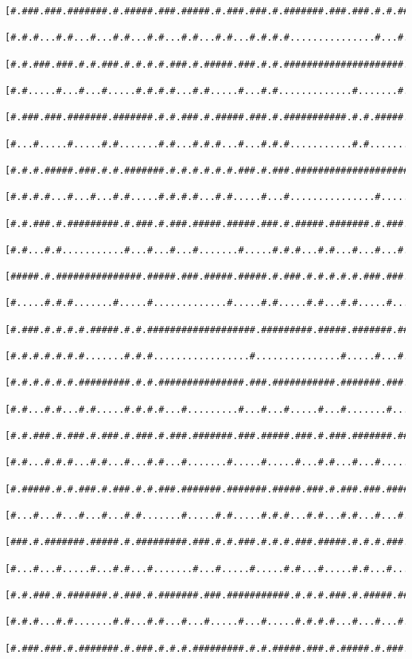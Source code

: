 \documentclass[a4paper,10pt,ngerman]{scrartcl}
\begin{document}
\begin{lstlisting}[frame=tb,basicstyle=\tiny\ttfamily]
 [#.###.###.#######.#.#####.###.#####.#.###.###.#.#######.###.###.#.#.#######.#.#.#.#######.#.#.#####.#]
 [#.#.#...#.#...#...#.#...#.#...#.#...#.#...#.#.#.#...............#...#.......#.#.#.#.......#.#.#.#...#]
 [#.#.###.###.#.#.###.#.#.#.#.###.#.#####.###.#.#.#####################.#######.#.#.#.#######.#.#.#.#.#]
 [#.#.....#...#...#.....#.#.#.#...#.#.....#...#.#.............#.......#.....#...#...#.#.....#.#...#.#.#]
 [#.###.###.#######.#######.#.#.###.#.#####.###.#.###########.#.#.#####.###.#.###.###.###.#.#.#####.#.#]
 [#...#.....#.....#.#.......#.#...#.#.#...#...#.#.#...........#.#.........#.#.#...#...#...#.#.#.....#.#]
 [#.#.#.#####.###.#.#.#######.#.#.#.#.#.#.###.#.###.#####################.#.#.#.###.###.#.###.#.#####.#]
 [#.#.#.#...#...#...#.#.....#.#.#.#...#.#.....#...#...............#.....#.#...#.#...#...#.#...#.....#.#]
 [#.#.###.#.#########.#.###.#.###.#####.#####.###.#.#####.#######.#.###.#.#####.#.###.###.#.###.###.###]
 [#.#...#.#...........#...#...#...#.......#.....#.#.#...#.#...#...#...#.#.#.....#.#...#...#.#...#.#...#]
 [#####.#.###############.#####.###.#####.#####.#.###.#.#.#.#.#.###.###.#.#.#####.#.###.###.#.###.###.#]
 [#.....#.#.#.......#.....#.............#.....#.#.....#.#...#.#.....#...#.#...#...#.#.#.#.#.#.#.....#.#]
 [#.###.#.#.#.#.#####.#.#.###################.#########.#####.#######.###.#####.###.#.#.#.#.#.#.#####.#]
 [#.#.#.#.#.#.#.......#.#.#.................#...............#.....#...#.#...#...#...#.#...#.#...#.....#]
 [#.#.#.#.#.#.#########.#.#.###############.###.###########.#######.###.###.#.###.###.###.#.#####.#####]
 [#.#...#.#...#.#.....#.#.#.#...#.........#...#...#.....#...#.......#.....#...#...#.......#.#.....#...#]
 [#.#.###.#.###.#.###.#.###.#.###.#######.###.#####.###.#.###.#######.###.#####.###########.#.#####.#.#]
 [#.#...#.#.#...#.#...#...#.#...#.......#.....#.....#...#.#...#...#.....#.....#...........#.#.......#.#]
 [#.#####.#.#.###.#.###.#.#.###.#######.#######.#####.###.#.###.###.#######.#.#.#########.#.#.#######.#]
 [#...#...#...#...#...#.#.......#.....#.#.....#.#.#...#.#...#.#...#...#.....#.#.#.........#.#.#...#...#]
 [###.#.#######.#####.#.#########.###.#.#.###.#.#.#.###.#####.#.#.#.###.#####.###.#########.#.#.#.#.#.#]
 [#...#...#.....#...#.#...#.......#...#.....#.....#.#...#.....#.#...#...#...#.#...#.........#.#.#...#.#]
 [#.#.###.#.#######.#.###.#.#######.###.###########.#.#.#.###.#.#####.###.#.#.#.###.###########.#####.#]
 [#.#.#...#.#.......#.#...#.#...#...#.....#...#.....#.#.#.#...#...#...#...#.#...#...#.....#.....#.....#]
 [#.###.###.#.#######.#.###.#.#.#.#########.#.#.#####.###.#.#####.#.###.#######.#.#####.#.###.###.#####]

\end{lstlisting}
\end{document}
